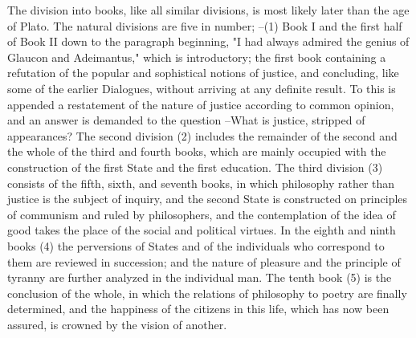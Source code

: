 The division into books, like all similar divisions, is most likely later than the age of Plato. The natural divisions are five in number; --(1) Book I and the first half of Book II down to the paragraph beginning, "I had always admired the genius of Glaucon and Adeimantus," which is introductory; the first book containing a refutation of the popular and sophistical notions of justice, and concluding, like some of the earlier Dialogues, without arriving at any definite result. To this is appended a restatement of the nature of justice according to common opinion, and an answer is demanded to the question --What is justice, stripped of appearances? The second division (2) includes the remainder of the second and the whole of the third and fourth books, which are mainly occupied with the construction of the first State and the first education. The third division (3) consists of the fifth, sixth, and seventh books, in which philosophy rather than justice is the subject of inquiry, and the second State is constructed on principles of communism and ruled by philosophers, and the contemplation of the idea of good takes the place of the social and political virtues. In the eighth and ninth books (4) the perversions of States and of the individuals who correspond to them are reviewed in succession; and the nature of pleasure and the principle of tyranny are further analyzed in the individual man. The tenth book (5) is the conclusion of the whole, in which the relations of philosophy to poetry are finally determined, and the happiness of the citizens in this life, which has now been assured, is crowned by the vision of another.

